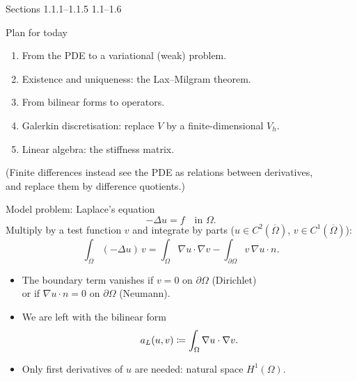 
{Sections 1.1.1--1.1.5}
{}
{1.1--1.6}

\begin{frame}{Plan for today}
    \begin{enumerate}
        \item From the PDE to a variational (weak) problem.
        \item Existence and uniqueness: the Lax--Milgram theorem.
        \item From bilinear forms to operators.
        \item Galerkin discretisation: replace $V$ by a finite-dimensional $V_h$.
        \item Linear algebra: the stiffness matrix.
    \end{enumerate}
    \bigskip
    \medskip
    {\small (Finite differences instead see the PDE as relations between derivatives,\\ and replace them by difference quotients.)}
\end{frame}

\begin{frame}{Model problem: Laplace's equation}
    \[
        -\Delta u = f \quad \text{in } \Omega.
    \]
    Multiply by a test function $v$ and integrate by parts ($u \in C^2(\overline\Omega)$, $v \in C^1(\overline \Omega)$):
    \[
        \int_\Omega (-\Delta u)\, v = \int_\Omega \nabla u \cdot \nabla v - \int_{\partial \Omega} v\, \nabla u \cdot n.
    \]
    \begin{itemize}
        \item The boundary term vanishes if $v = 0$ on $\partial\Omega$ (Dirichlet)\\ or if $\nabla u \cdot n = 0$ on $\partial\Omega$ (Neumann).
        \item We are left with the bilinear form
              \[
                  a_L(u,v) \coloneqq \int_\Omega \nabla u \cdot \nabla v .
              \]
        \item Only \alert{first derivatives} of $u$ are needed: natural space $H^1(\Omega)$.
    \end{itemize}
\end{frame}

